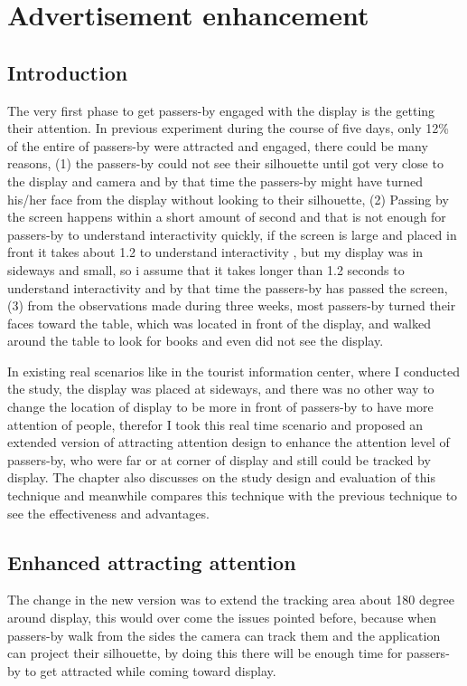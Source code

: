 \chapter{Advertisement enhancement} %

\label{Chapter9} %
\newpage






\section{Introduction}

The very first phase to get passers-by engaged with the display is the getting their attention. In previous experiment during the course of five days, only 12\% of the entire of passers-by were attracted and engaged, there could be many reasons, (1) the passers-by could not see their silhouette until got very close to the display and camera and by that time the passers-by might have turned his/her face from the display without looking to their silhouette, (2) Passing by the screen happens within a short amount of second and that is not enough for passers-by to understand interactivity quickly, if the screen is large and placed in front it takes about 1.2 to understand interactivity \cite{LookingGlass}, but my display was in sideways and small, so i assume that it takes longer than 1.2 seconds to understand interactivity and by that time the passers-by has passed the screen, (3) from the observations made during three weeks, most passers-by turned their faces toward the table, which was located in front of the display, and walked around the table to look for books and even did not see the display.

In existing real scenarios like in the tourist information center, where I conducted the study, the display was placed at sideways, and there was no other way to change the location of display to be more in front of passers-by to have more attention of people, therefor I took this real time scenario and proposed an extended version of attracting attention design to enhance the attention level of passers-by, who were far or at corner of display and still could be tracked by display. The chapter also discusses on the study design and evaluation of this technique and meanwhile compares this technique with the previous technique to see the effectiveness and advantages.


\section{Enhanced attracting attention}
The change in the new version was to extend the tracking area about 180 degree around display, this would over come the issues pointed before, because when passers-by walk from the sides the camera can track them and the application can project their silhouette, by doing this there will be enough time for passers-by to get attracted while coming toward display. 

